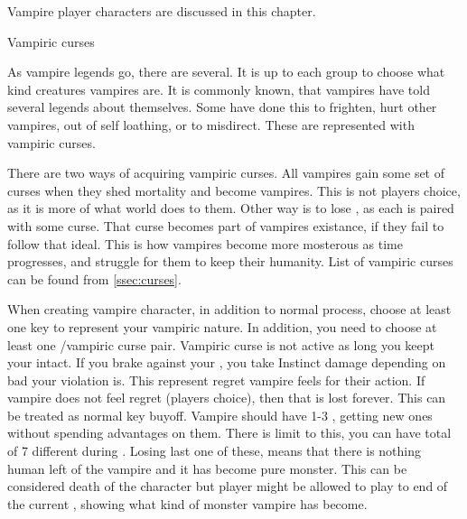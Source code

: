 Vampire player characters are discussed in this chapter.

Vampiric curses

As vampire legends go, there are several.
It is up to each group to choose what kind creatures vampires are.
It is commonly known, that vampires have told several legends about themselves.
Some have done this to frighten, hurt other vampires, out of self loathing, or to misdirect.
These are represented with vampiric curses.

There are two ways of acquiring vampiric curses.
All vampires gain some set of curses when they shed mortality and become vampires.
This is not players choice, as it is more of what world does to them.
Other way is to lose \humanity{}, as each \humanity is paired with some curse.
That curse becomes part of vampires existance, if they fail to follow that ideal.
This is how vampires become more mosterous as time progresses, and struggle for them to keep their humanity.
List of vampiric curses can be found from \ref{ssec:curses}.

When creating vampire character, in addition to normal process, choose at least one key to represent your vampiric nature.
In addition, you need to choose at least one \humanity/vampiric curse pair.
Vampiric curse is not active as long you keept your \humanity intact.
If you brake against your \humanity, you take Instinct damage depending on bad your violation is.
This represent regret vampire feels for their action.
If vampire does not feel regret (players choice), then that \humanity is lost forever.
This can be treated as normal key buyoff.
Vampire should have 1-3 \humanities, getting new ones without spending advantages on them.
There is limit to this, you can have total of 7 different \humanities during \campaign.
Losing last one of these, means that there is nothing human left of the vampire and it has become pure monster.
This can be considered death of the character but player might be allowed to play to end of the current \session, showing what kind of monster vampire has become.



\pagebreak
